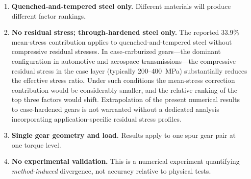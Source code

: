 \documentclass[12pt,a4paper]{article}
\begin{document}
\begin{enumerate}
        non-informative censoring. The Shapiro--Wilk test rejects
        strict normality ($W=0.960$, $p=0.0016$; \S\ref{sec:methods}),
        though the mild skewness ($-0.44$) and the stability of the
        bootstrap variance fractions (Table~\ref{tab:anova}) suggest
        that the practical impact on the variance decomposition is
        limited. Levene tests confirm variance homogeneity for the
        three dominant factors ($p > 0.5$). The censoring pattern is
        physically interpretable (run-outs cluster with Gerber
        correction and ground surfaces; \S\ref{sec:torque}) and is
        unlikely to be informative in the sense of masking
        factor-dependent effects.
  \item \textbf{Quenched-and-tempered steel only.} Different materials
        will produce different factor rankings.
  \item \textbf{No residual stress; through-hardened steel only.} The
        reported 33.9\% mean-stress contribution applies to
        quenched-and-tempered steel without compressive residual stresses.
        In case-carburized gears---the dominant configuration in automotive
        and aerospace transmissions---the compressive residual stress in the
        case layer (typically 200--400~MPa) substantially reduces the
        effective stress ratio. Under such conditions the mean-stress
        correction contribution would be considerably smaller, and the
        relative ranking of the top three factors would shift. Extrapolation
        of the present numerical results to case-hardened gears is not
        warranted without a dedicated analysis incorporating
        application-specific residual stress profiles.
  \item \textbf{Single gear geometry and load.} Results apply to one spur
        gear pair at one torque level.
  \item \textbf{No experimental validation.} This is a numerical
        experiment quantifying \emph{method-induced} divergence, not
        accuracy relative to physical tests.
\end{enumerate}
\end{document}

